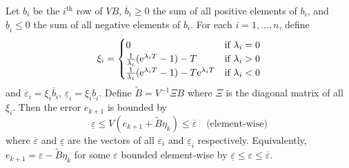 \begin{theorem}
  \label{thm:averaged-sys-bound}
  Let $b_i$ be the $i^{\text{th}}$ row of $VB$, $\overbar{b}_i \geqslant 0$ the sum of all positive elements of $b_i$, and $\underline{b}_i \leqslant 0$ the sum of all negative elements of $b_i$.
  For each $i = 1,\ldots,n$, define
  \[ \xi_i =
  \begin{cases}
    0 & \text{if $\lambda_{i} = 0$} \\
    \frac{1}{\lambda_i} (\mathrm{e}^{\lambda_i T} - 1) - T & \text{if $\lambda_i > 0$}\\
    \frac{1}{\lambda_i} (\mathrm{e}^{\lambda_i T} - 1) - T \mathrm{e}^{\lambda_i T} & \text{if $\lambda_i < 0$}
  \end{cases} \]
  and $\overbar{\varepsilon}_{i} = \xi_{i} \overbar{b}_{i}$, $\underline{\varepsilon}_{i} = \xi_{i} \underline{b}_{i}$.
  Define $\tilde{B} = V^{-1} \Xi B$ where $\Xi$ is the diagonal matrix of all $\xi_{i}$.
  Then the error $e_{k+1}$ is bounded by
  \begin{equation*}
    \underline{\varepsilon} \leqslant V (e_{k+1} + \tilde{B} \eta_{k}) \leqslant \overbar{\varepsilon} \quad \text{(element-wise)}
  \end{equation*}
  where $\overbar{\varepsilon}$ and $\underline{\varepsilon}$ are the vectors of all $\overbar{\varepsilon}_{i}$ and $\underline{\varepsilon}_{i}$ respectively.
  Equivalently, $e_{k+1} = \varepsilon - \tilde{B} \eta_{k}$ for some $\varepsilon$ bounded element-wise by $\underline{\varepsilon} \leqslant \varepsilon \leqslant \overbar{\varepsilon}$.
\end{theorem}




